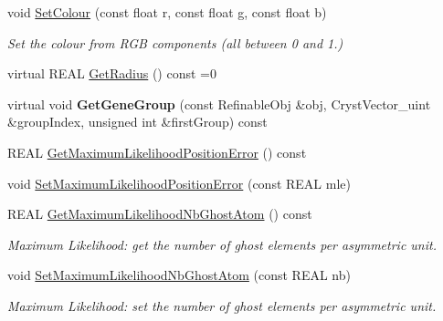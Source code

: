 \begin{DoxyCompactItemize}
\mbox{\label{class_obj_cryst_1_1_scattering_power_a312da0ad4d8229baf7d6ab7ff9c45a3c}} 
void \mbox{\hyperlink{class_obj_cryst_1_1_scattering_power_a312da0ad4d8229baf7d6ab7ff9c45a3c}{Set\+Colour}} (const float r, const float g, const float b)
\begin{DoxyCompactList}\small\item\em Set the colour from R\+GB components (all between 0 and 1.) \end{DoxyCompactList}\item 
virtual R\+E\+AL \mbox{\hyperlink{class_obj_cryst_1_1_scattering_power_ac44860aca21734844379ddec87622f7b}{Get\+Radius}} () const =0
\item 
\mbox{\label{class_obj_cryst_1_1_scattering_power_ab855a12e700cc0dec0ea5810b141301c}} 
virtual void {\bfseries Get\+Gene\+Group} (const Refinable\+Obj \&obj, Cryst\+Vector\+\_\+uint \&group\+Index, unsigned int \&first\+Group) const
\item 
R\+E\+AL \mbox{\hyperlink{class_obj_cryst_1_1_scattering_power_ae5d793cc7bb07b5aae0a8dc3c322ba6d}{Get\+Maximum\+Likelihood\+Position\+Error}} () const
\item 
void \mbox{\hyperlink{class_obj_cryst_1_1_scattering_power_aeba30efe61155572ffdada1121578bc9}{Set\+Maximum\+Likelihood\+Position\+Error}} (const R\+E\+AL mle)
\item 
\mbox{\label{class_obj_cryst_1_1_scattering_power_a724900d7f7714f47ca62a715e26dd5ca}} 
R\+E\+AL \mbox{\hyperlink{class_obj_cryst_1_1_scattering_power_a724900d7f7714f47ca62a715e26dd5ca}{Get\+Maximum\+Likelihood\+Nb\+Ghost\+Atom}} () const
\begin{DoxyCompactList}\small\item\em Maximum Likelihood\+: get the number of ghost elements per asymmetric unit. \end{DoxyCompactList}\item 
\mbox{\label{class_obj_cryst_1_1_scattering_power_aa3343885c4b3b9d41c386f7d8aaacd63}} 
void \mbox{\hyperlink{class_obj_cryst_1_1_scattering_power_aa3343885c4b3b9d41c386f7d8aaacd63}{Set\+Maximum\+Likelihood\+Nb\+Ghost\+Atom}} (const R\+E\+AL nb)
\begin{DoxyCompactList}\small\item\em Maximum Likelihood\+: set the number of ghost elements per asymmetric unit. \end{DoxyCompactList}\item 

\end{DoxyCompactItemize}
